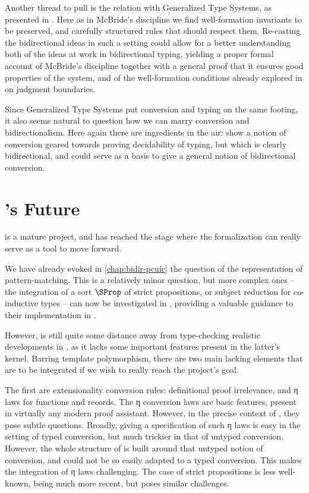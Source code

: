 Another thread to pull is the relation with Generalized Type Systems, as presented in
. Here as in McBride’s discipline we find
well-formation invariants to be preserved,
and carefully structured rules that should respect them. Re-casting
the bidirectional ideas in such a setting could allow for a better understanding both of the
ideas at work in bidirectional typing,
yielding a proper formal account of McBride’s discipline
together with a general proof that it ensures
good properties of the system, and of the well-formation conditions already explored in
\textcite{Bauer2020} on judgment boundaries.

Since Generalized Type Systems put conversion and typing on the same footing,
it also seems natural
to question how we can marry conversion and bidirectionalism. Here again there are ingredients in
the air:  show a notion of conversion geared towards proving decidability
of typing, but which is clearly bidirectional, and could serve as a basis to give a general
notion of bidirectional conversion.

\section{’s Future}

 is a mature project, and has reached the stage
where the formalization can really
serve as a tool to move  forward.

We have already evoked in \cref{chap:bidir-pcuic} the question of the representation of pattern-matching.
This is a relatively minor question, but more complex ones – \eg 
the integration of a sort $\SProp$ of strict propositions, or subject reduction for
co-inductive types –
can now be investigated in , providing a valuable guidance 
to their implementation in .

However,  is still quite some distance away from type-checking realistic developments
in , as it lacks some important features present in the latter’s kernel. Barring
template polymorphism,%
there are two main lacking elements that are to be integrated if we wish to really reach the
project’s goal.

The first are extensionality conversion rules: definitional proof irrelevance,
and η laws for functions and records.
The η conversion laws are basic features, present in virtually
any modern proof assistant. However,
in the precise context of , they pose subtle questions.%
%
Broadly, giving a specification of such η laws is easy in the setting of typed conversion, but
much trickier in that of untyped conversion. However, the whole structure of  is built
around that untyped notion of conversion, and could not be so easily adapted to a typed
conversion. This makes the integration of η laws challenging. The case of strict propositions is
less well-known, being much more recent, but poses similar challenges.

